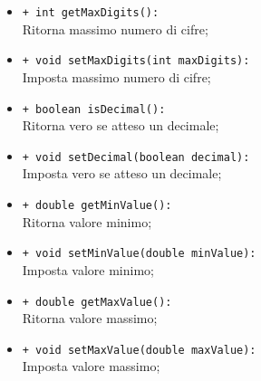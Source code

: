 \begin{flushleft}
\begin{itemize}
\begin{sloppypar}
\begin{itemize}
\item \texttt{+ int getMaxDigits():}\\ Ritorna massimo numero di cifre;
\item \texttt{+ void setMaxDigits(int maxDigits):}\\ Imposta massimo numero di cifre;
\item \texttt{+ boolean isDecimal():}\\ Ritorna vero se atteso un decimale;
\item \texttt{+ void setDecimal(boolean decimal):}\\ Imposta vero se atteso un decimale;
\item \texttt{+ double getMinValue():}\\ Ritorna valore minimo;
\item \texttt{+ void setMinValue(double minValue):}\\ Imposta valore minimo;
\item \texttt{+ double getMaxValue():}\\ Ritorna valore massimo;
\item \texttt{+ void setMaxValue(double maxValue):}\\ Imposta valore massimo;
\end{itemize}
\end{sloppypar}
\end{itemize}
\end{flushleft}

